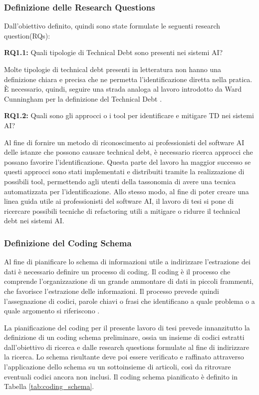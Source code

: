 \subsubsection{Definizione delle Research Questions}
Dall'obiettivo definito, quindi sono state formulate le seguenti research question(RQs):
\hfill \break
\begin{rqbox}
\textbf{RQ1.1:} Quali tipologie di Technical Debt sono presenti nei sistemi AI?
\end{rqbox}
Molte tipologie di technical debt presenti in letteratura non hanno una definizione chiara
e precisa che ne permetta l’identificazione diretta nella pratica. È necessario, quindi,
seguire una strada analoga al lavoro introdotto da Ward Cunningham per la definizione
del Technical Debt \cite{Cunningham1992td}.
\hfill \break
\begin{rqbox}
\textbf{RQ1.2:} Quali sono gli approcci o i tool per identificare e mitigare TD nei sistemi AI?
\end{rqbox}
Al fine di fornire un metodo di riconoscimento ai professionisti del software AI delle istanze che possono causare technical debt, è necessario ricerca approcci che possano favorire l'identificazione. Questa parte del lavoro ha maggior successo se questi approcci sono stati implementati e distribuiti tramite la realizzazione di possibili tool, permettendo agli utenti della tassonomia di avere una tecnica automatizzata per l'identificazione.
Allo stesso modo, al fine di poter creare una linea guida utile ai professionisti del software AI, il lavoro di tesi si pone di ricercare possibili tecniche di refactoring utili a mitigare o ridurre il technical debt nei sistemi AI.

\subsubsection{Definizione del Coding Schema}

Al fine di pianificare lo schema di informazioni utile a indirizzare l'estrazione dei dati è necessario definire un processo di coding.
Il coding è il processo che comprende l'organizzazione di un grande ammontare di dati in piccoli frammenti, che favorisce l'estrazione delle informazioni.
Il processo prevede quindi l'assegnazione di codici, parole chiavi o frasi che identificano a quale problema o a quale argomento si riferiscono \cite{bailey2017guide}. 

La pianificazione del coding per il presente lavoro di tesi prevede innanzitutto la definizione di un coding schema preliminare, ossia un insieme di codici estratti dall'obiettivo di ricerca e dalle research questions formulate al fine di indirizzare la ricerca. Lo schema risultante deve poi essere verificato e raffinato attraverso l'applicazione dello schema su un sottoinsieme di articoli, così da ritrovare eventuali codici ancora non inclusi.
Il coding schema pianificato è definito in Tabella \ref{tab:coding_schema}.

